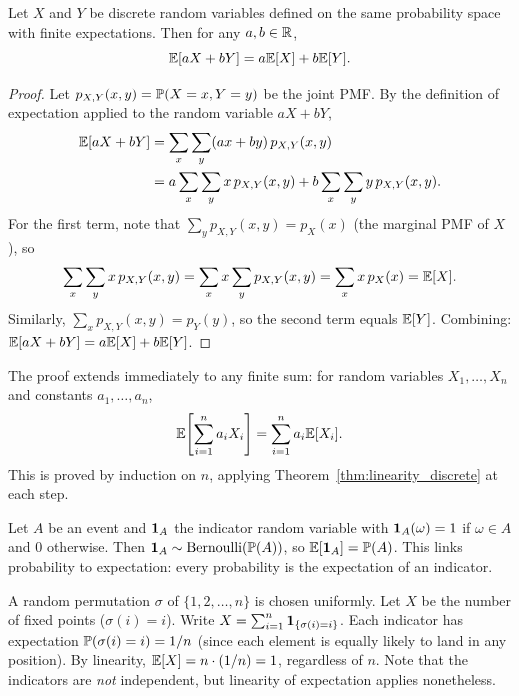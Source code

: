 \documentclass[11pt,a4paper]{article}
\begin{document}
\begin{theorem}
\label{thm:linearity_discrete}
Let $X$ and $Y$ be discrete random variables defined on the same
probability space with finite expectations. Then for any
$a, b \in \mathbb{R}$,
\[
    \mathbb{E}[aX + bY] = a\mathbb{E}[X] + b\mathbb{E}[Y].
\]
\end{theorem}

\begin{proof}
Let $p_{X,Y}(x,y) = \mathbb{P}(X = x, Y = y)$ be the joint PMF. By the
definition of expectation applied to the random variable $aX + bY$,
\begin{align*}
    \mathbb{E}[aX + bY]
    &= \sum_x \sum_y (ax + by) \, p_{X,Y}(x,y) \\
    &= a \sum_x \sum_y x \, p_{X,Y}(x,y)
       + b \sum_x \sum_y y \, p_{X,Y}(x,y).
\end{align*}
For the first term, note that
$\sum_y p_{X,Y}(x,y) = p_X(x)$ (the marginal PMF of $X$), so
\[
    \sum_x \sum_y x \, p_{X,Y}(x,y)
    = \sum_x x \sum_y p_{X,Y}(x,y)
    = \sum_x x \, p_X(x)
    = \mathbb{E}[X].
\]
Similarly, $\sum_x p_{X,Y}(x,y) = p_Y(y)$, so the second term
equals $\mathbb{E}[Y]$. Combining:
$\mathbb{E}[aX + bY] = a\mathbb{E}[X] + b\mathbb{E}[Y]$.
\end{proof}

\begin{remark}
\label{rem:linearity_general}
The proof extends immediately to any finite sum: for random variables
$X_1, \ldots, X_n$ and constants $a_1, \ldots, a_n$,
\[
    \mathbb{E}\!\left[\sum_{i=1}^n a_i X_i\right]
    = \sum_{i=1}^n a_i \mathbb{E}[X_i].
\]
This is proved by induction on $n$, applying
Theorem~\ref{thm:linearity_discrete} at each step.
\end{remark}

\begin{example}
\label{ex:indicator_expectation}
Let $A$ be an event and $\mathbf{1}_A$ the indicator random variable
with $\mathbf{1}_A(\omega) = 1$ if $\omega \in A$ and $0$ otherwise.
Then $\mathbf{1}_A \sim \mathrm{Bernoulli}(\mathbb{P}(A))$, so
$\mathbb{E}[\mathbf{1}_A] = \mathbb{P}(A)$. This links probability to expectation:
every probability is the expectation of an indicator.
\end{example}

\begin{example}
\label{ex:fixed_points}
A random permutation $\sigma$ of $\{1, 2, \ldots, n\}$ is chosen
uniformly. Let $X$ be the number of fixed points ($\sigma(i) = i$).
Write $X = \sum_{i=1}^n \mathbf{1}_{\{\sigma(i)=i\}}$. Each indicator
has expectation $\mathbb{P}(\sigma(i) = i) = 1/n$ (since each element is
equally likely to land in any position). By linearity,
$\mathbb{E}[X] = n \cdot (1/n) = 1$,
regardless of $n$. Note that the indicators are \emph{not} independent,
but linearity of expectation applies nonetheless.
\end{example}
\end{document}
